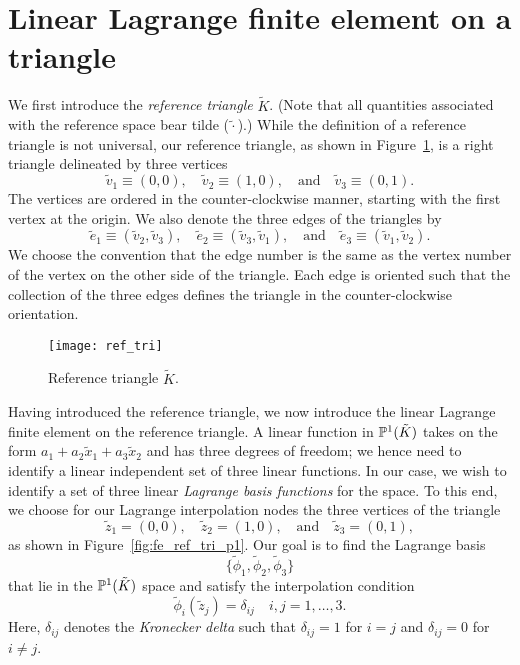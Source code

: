 \section{Linear Lagrange finite element on a triangle}
\label{sec:fe_lin_tri}
We first introduce the \emph{reference triangle} $\tilde K$.  (Note that all quantities associated with the reference space bear tilde ($\tilde \cdot$).) While the definition of a reference triangle is not universal, our reference triangle, as shown in Figure~\ref{fig:fe_ref_tri}, is a right triangle delineated by three vertices
\begin{equation*}
  \tilde v_1 \equiv (0,0), \quad \tilde v_2 \equiv (1,0), \quad \text{and} \quad \tilde v_3 \equiv (0,1).
\end{equation*}
The vertices are ordered in the counter-clockwise manner, starting with the first vertex at the origin. We also denote the three edges of the triangles by
\begin{equation*}
  \tilde e_1 \equiv ( \tilde v_2, \tilde v_3), \quad  \tilde e_2 \equiv ( \tilde v_3, \tilde v_1), \quad \text{and} \quad  \tilde e_3 \equiv ( \tilde v_1, \tilde v_2).
\end{equation*}
We choose the convention that the edge number is the same as the vertex number of the vertex on the other side of the triangle. Each edge is oriented such that the collection of the three edges defines the triangle in the counter-clockwise orientation.  

\begin{figure}
  \centering
  \texttt{[image: ref\_tri]}
  \caption{Reference triangle $\tilde K$.}
  \label{fig:fe_ref_tri}
\end{figure}

Having introduced the reference triangle, we now introduce the linear Lagrange finite element on the reference triangle. A linear function in $\mathbb{P}^1(\tilde K)$ takes on the form $a_1 + a_2 \tilde x_1 + a_3 \tilde x_2$ and has three degrees of freedom; we hence need to identify a linear independent set of three linear functions.  In our case, we wish to identify a set of three linear \emph{Lagrange basis functions} for the space.  To this end, we choose for our Lagrange interpolation nodes the three vertices of the triangle
\begin{equation*}
  \tilde z_1 = (0,0), \quad \tilde z_2 = (1,0), \quad \text{and} \quad \tilde z_3 = (0,1),
\end{equation*}
as shown in Figure~\ref{fig:fe_ref_tri_p1}. Our goal is to find the Lagrange basis 
\begin{equation*}
  \{ \tilde \phi_1, \tilde \phi_2, \tilde \phi_3 \}
\end{equation*}
that lie in the $\mathbb{P}^1(\tilde K)$ space and satisfy the interpolation condition
\begin{equation}
  \tilde \phi_i(\tilde z_j) = \delta_{ij} \quad i,j = 1,\dots,3.
   \label{eq:fe_interp_tri}
\end{equation}
Here, $\delta_{ij}$ denotes the \emph{Kronecker delta} such that $\delta_{ij} = 1$ for $i = j$ and $\delta_{ij} = 0$ for $i \neq j$.

